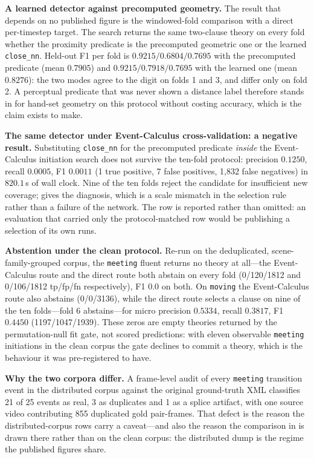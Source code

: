 \textbf{A learned detector against precomputed geometry.} The result that depends on no published figure is the windowed-fold comparison with a direct per-timestep target. The search returns the same two-clause theory on every fold whether the proximity predicate is the precomputed geometric one or the learned \texttt{close\_nn}. Held-out F1 per fold is $0.9215 / 0.6804 / 0.7695$ with the precomputed predicate (mean $0.7905$) and $0.9215 / 0.7918 / 0.7695$ with the learned one (mean $0.8276$): the two modes agree to the digit on folds 1 and 3, and differ only on fold 2. A perceptual predicate that was never shown a distance label therefore stands in for hand-set geometry on this protocol without costing accuracy, which is the claim  exists to make.

\textbf{The same detector under Event-Calculus cross-validation: a negative result.} Substituting \texttt{close\_nn} for the precomputed predicate \emph{inside} the Event-Calculus initiation search does not survive the ten-fold protocol: precision $0.1250$, recall $0.0005$, F1 $0.0011$ (1 true positive, 7 false positives, 1{,}832 false negatives) in $820.1$\,s of wall clock. Nine of the ten folds reject the candidate for insufficient new coverage;  gives the diagnosis, which is a scale mismatch in the selection rule rather than a failure of the network. The row is reported rather than omitted: an evaluation that carried only the protocol-matched row would be publishing a selection of its own runs.

\textbf{Abstention under the clean protocol.} Re-run on the deduplicated, scene-family-grouped corpus, the \texttt{meeting} fluent returns no theory at all---the Event-Calculus route and the direct route both abstain on every fold (0/120/1812 and 0/106/1812 tp/fp/fn respectively), F1 $0.0$ on both. On \texttt{moving} the Event-Calculus route also abstains (0/0/3136), while the direct route selects a clause on nine of the ten folds---fold 6 abstains---for micro precision $0.5334$, recall $0.3817$, F1 $0.4450$ (1197/1047/1939). These zeros are empty theories returned by the permutation-null fit gate, not scored predictions: with eleven observable \texttt{meeting} initiations in the clean corpus the gate declines to commit a theory, which is the behaviour it was pre-registered to have.

\textbf{Why the two corpora differ.} A frame-level audit of every \texttt{meeting} transition event in the distributed corpus against the original ground-truth XML classifies 21 of 25 events as real, 3 as duplicates and 1 as a splice artifact, with one source video contributing 855 duplicated gold pair-frames. That defect is the reason the distributed-corpus rows carry a caveat---and also the reason the comparison in  is drawn there rather than on the clean corpus: the distributed dump is the regime the published figures share.

